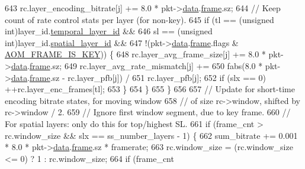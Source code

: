 \begin{DoxyCodeInclude}
{{{{{{{{{{{{{{{{{{643                   rc.layer\_encoding\_bitrate[j] += 8.0 * pkt->\hyperlink{structaom__codec__cx__pkt_afb379cd4bfa7692d1d6e85f4e4b2b410}{data}.\hyperlink{structaom__codec__cx__pkt_a4180a6ae59b0d295bc915d4689df4cb0}{frame}.sz;
644                 \textcolor{comment}{// Keep count of rate control stats per layer (for non-key).}
645                 \textcolor{keywordflow}{if} (tl == (\textcolor{keywordtype}{unsigned} \textcolor{keywordtype}{int})layer\_id.\hyperlink{structaom__svc__layer__id_a9a28c1b126e8d1fdda6e1d881afb66fb}{temporal\_layer\_id} &&
646                     sl == (\textcolor{keywordtype}{unsigned} \textcolor{keywordtype}{int})layer\_id.\hyperlink{structaom__svc__layer__id_af018f2e9cc472827a75b92a78ba6ee4e}{spatial\_layer\_id} &&
647                     !(pkt->\hyperlink{structaom__codec__cx__pkt_afb379cd4bfa7692d1d6e85f4e4b2b410}{data}.\hyperlink{structaom__codec__cx__pkt_a4180a6ae59b0d295bc915d4689df4cb0}{frame}.flags & \hyperlink{group__encoder_gaf4a58f123913a5eef0a3796f0619e5f3}{AOM\_FRAME\_IS\_KEY})) \{
648                   rc.layer\_avg\_frame\_size[j] += 8.0 * pkt->\hyperlink{structaom__codec__cx__pkt_afb379cd4bfa7692d1d6e85f4e4b2b410}{data}.\hyperlink{structaom__codec__cx__pkt_a4180a6ae59b0d295bc915d4689df4cb0}{frame}.sz;
649                   rc.layer\_avg\_rate\_mismatch[j] +=
650                       fabs(8.0 * pkt->\hyperlink{structaom__codec__cx__pkt_afb379cd4bfa7692d1d6e85f4e4b2b410}{data}.\hyperlink{structaom__codec__cx__pkt_a4180a6ae59b0d295bc915d4689df4cb0}{frame}.sz - rc.layer\_pfb[j]) /
651                       rc.layer\_pfb[j];
652                   \textcolor{keywordflow}{if} (slx == 0) ++rc.layer\_enc\_frames[tl];
653                 \}
654               \}
655             \}
656 
657             \textcolor{comment}{// Update for short-time encoding bitrate states, for moving window}
658             \textcolor{comment}{// of size rc->window, shifted by rc->window / 2.}
659             \textcolor{comment}{// Ignore first window segment, due to key frame.}
660             \textcolor{comment}{// For spatial layers: only do this for top/highest SL.}
661             \textcolor{keywordflow}{if} (frame\_cnt > rc.window\_size && slx == ss\_number\_layers - 1) \{
662               sum\_bitrate += 0.001 * 8.0 * pkt->\hyperlink{structaom__codec__cx__pkt_afb379cd4bfa7692d1d6e85f4e4b2b410}{data}.\hyperlink{structaom__codec__cx__pkt_a4180a6ae59b0d295bc915d4689df4cb0}{frame}.sz * framerate;
663               rc.window\_size = (rc.window\_size <= 0) ? 1 : rc.window\_size;
664               if (frame\_cnt %
}}}}}}}}}}}}}}}}}}
\end{DoxyCodeInclude}
